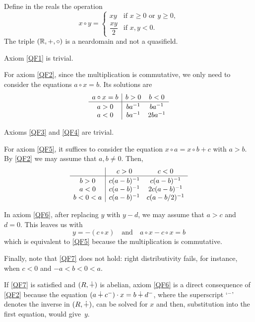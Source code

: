 \begin{xmpl}{}
    Define in the reals the operation
    \[
        x\circ y=\begin{cases}
            xy  &\text{if }x\ge0\text{ or }y\ge0,\\[1mm]
            \dfrac{xy}2    &\text{if }x,y<0.
        \end{cases}
    \]
    The triple $(\mathbb{R},+,\circ)$ is a neardomain and not a quasifield.

    Axiom \textsc{\ref{QF1}} is trivial.

    For axiom \textsc{\ref{QF2}}, since the multiplication is commutative, we only need to consider the equations $a\circ x=b$. Its solutions are
    \[
        \begin{array}{c|cc}
            a\circ x=b&b>0 &b<0\\
            \hline\rule{0mm}{3.5mm}
            a>0&ba^{-1}&ba^{-1}\\
            a<0&ba^{-1}&2ba^{-1}
        \end{array}
    \]

    Axioms \textsc{\ref{QF3}} and \textsc{\ref{QF4}} are trivial.

    For axiom \textsc{\ref{QF5}}, it suffices to consider the equation $x\circ a=x\circ b+c$ with $a>b$. By \textsc{\ref{QF2}} we may assume that $a,b\ne0$. Then,
    \[
        \begin{array}{c|cc}
            &c>0 &c<0\\
            \hline\rule{0mm}{3.5mm}
            b>0&c(a-b)^{-1}&c(a-b)^{-1}\\
            a<0&c(a-b)^{-1}&2c(a-b)^{-1}\\
            b<0<a&c(a-b)^{-1}&c(a-b/2)^{-1}
        \end{array}
    \]

    In axiom \textsc{\ref{QF6}}, after replacing $y$ with $y-d$, we may assume that $a>c$ and $d=0$. This leaves us with
    \[
        y = -(c\circ x)\quad\text{and}\quad
        a\circ x- c\circ x=b
    \]
    which is equivalent to \textsc{\ref{QF5}} because the multiplication is commutative.

    Finally, note that \textsc{\ref{QF7}} does not hold: right distributivity fails, for instance, when $c<0$ and $-a<b<0<a$.
\end{xmpl}

\begin{rem}\label{rem:qf7-implies-qf6}
    If \textsc{\ref{QF7}} is satisfied and $(R,\dotplus)$ is abelian, axiom \textsc{\ref{QF6}} is a direct consequence of \textsc{\ref{QF2}} because the equation $(a\dotplus c^-)\cdot x=b\dotplus d^-$, where the superscript `${}^-$' denotes the inverse in $(R,\dotplus)$, can be solved for $x$ and then, substitution into the first equation, would give~$y$.
\end{rem}

